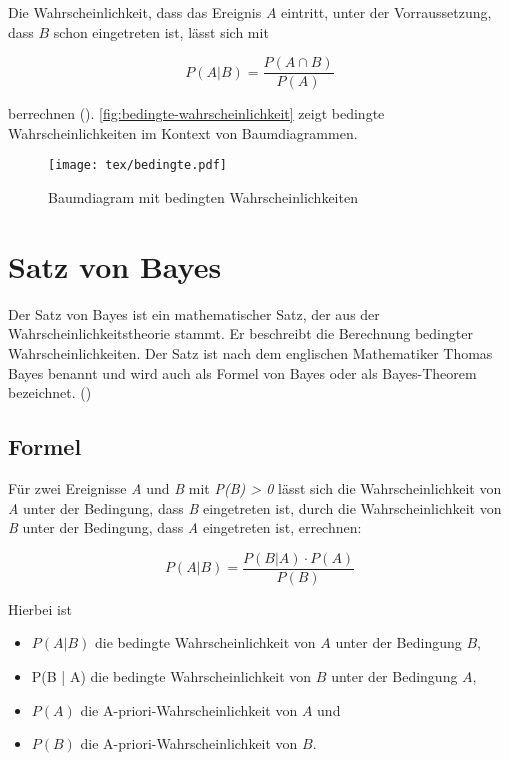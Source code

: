 Die Wahrscheinlichkeit, dass das Ereignis $A$ eintritt, unter der Vorraussetzung, dass $B$ schon eingetreten ist, lässt sich mit

\begin{equation*}
    P(A | B) = \frac{P(A \cap B)}{P(A)}
\end{equation*}

berrechnen (\cite[404]{Papula:2014}).
\autoref{fig:bedingte-wahrscheinlichkeit} zeigt bedingte Wahrscheinlichkeiten im Kontext von Baumdiagrammen.

\begin{figure}
    \centering
    \texttt{[image: tex/bedingte.pdf]}
    \caption{Baumdiagram mit bedingten Wahrscheinlichkeiten}\label{fig:bedingte-wahrscheinlichkeit}
\end{figure}

\section{Satz von Bayes}

Der Satz von Bayes ist ein mathematischer Satz, der aus der Wahrscheinlichkeitstheorie stammt. Er beschreibt die Berechnung bedingter
Wahrscheinlichkeiten.
Der Satz ist nach dem englischen Mathematiker Thomas Bayes benannt und wird auch als Formel von Bayes oder als Bayes-Theorem bezeichnet. (\cite[S.406f]{Papula:2014})

\subsection{Formel}

Für zwei Ereignisse \textit{A} und \textit{B} mit \textit{P(B) > 0} lässt sich die Wahrscheinlichkeit von \textit{A} unter der Bedingung, dass \textit{B} eingetreten
ist, durch die Wahrscheinlichkeit von \textit{B} unter der Bedingung, dass \textit{A} eingetreten ist, errechnen:

\begin{equation*}
    P(A | B) = \frac{P(B | A) \cdot P(A)}{P(B)}
\end{equation*}

Hierbei ist

\begin{itemize}
    \item $P(A | B)$ die bedingte Wahrscheinlichkeit von $A$ unter der Bedingung $B$,
    \item P(B | A) die bedingte Wahrscheinlichkeit von $B$ unter der Bedingung $A$,
    \item $P(A)$ die A-priori-Wahrscheinlichkeit von $A$ und
    \item $P(B)$ die A-priori-Wahrscheinlichkeit von $B$.
\end{itemize}

